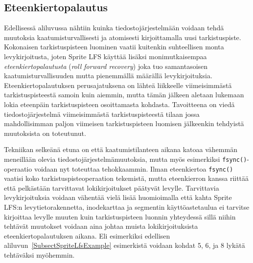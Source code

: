 \subsection{Eteenkiertopalautus}

Edellisessä aliluvussa nähtiin kuinka tiedostojärjestelmään voidaan tehdä muutoksia kaatumisturvallisesti ja atomisesti kirjoittamalla uusi tarkistuspiste.
Kokonaisen tarkistuspisteen luominen vaatii kuitenkin suhteellisen monta levykirjoitusta,
joten Sprite LFS käyttää lisäksi monimutkaisempaa \emph{eteenkiertopalautusta} (\emph{roll forward recovery}) joka tuo samantasoisen kaatumisturvallisuuden mutta pienemmällä määrällä levykirjoituksia.
Eteenkiertopalautuksen perusajatuksena on lähteä liikkeelle viimeisimmästä tarkistuspisteestä samoin kuin aiemmin,
mutta tämän jälkeen aletaan lukemaan lokia eteenpäin tarkistuspisteen osoittamasta kohdasta.
Tavoitteena on viedä tiedostojärjestelmä viimeisimmästä tarkistuspisteestä tilaan jossa mahdollisimman paljon viimeisen tarkistuspisteen luomisen jälkeenkin tehdyistä muutoksista on toteutunut.

Tekniikan selkeänä etuna on että kaatumistilanteen aikana katoaa vähemmän meneillään olevia tiedostojärjestelmämuutoksia,
mutta myös esimerkiksi \texttt{fsync()}-operaatio voidaan nyt toteuttaa tehokkaammin.
Ilman eteenkiertoa \texttt{fsync()} vaatisi koko tarkistuspisteoperaation tekemistä,
mutta eteenkierron kanssa riittää että pelkästään tarvittavat lokikirjoitukset päätyvät levylle.
Tarvittavia levykirjoituksia voidaan vähentää vielä lisää huomioimalla että kahta Sprite LFS:n levytietorakennetta,
inodekarttaa ja segmentin käyttöastetaulua ei tarvitse kirjoittaa levylle muuten kuin tarkistuspisteen luonnin yhteydessä
sillä niihin tehtävät muutokset voidaan aina johtaa muista lokikirjoituksista eteenkiertopalautuksen aikana.
Eli esimerkiksi edellisen aliluvun~\ref{SubsectSpriteLfsExample} esimerkistä voidaan kohdat 5, 6, ja 8 lykätä tehtäväksi myöhemmin.

